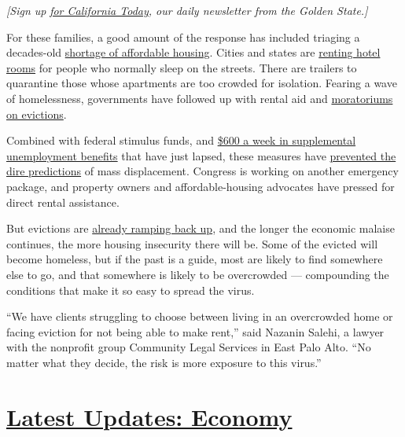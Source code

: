 \emph{{[}Sign up}
\href{https://www.nytimes3xbfgragh.onion/newsletters/california-today}{\emph{for
California Today}}\emph{, our daily newsletter from the Golden
State.{]}}

For these families, a good amount of the response has included triaging
a decades-old
\href{https://reports.nlihc.org/gap\#:~:text=The\%20U.S.\%20has\%20a\%20shortage,extremely\%20low\%2Dincome\%20renter\%20households.}{shortage
of affordable housing}. Cities and states are
\href{https://www.kqed.org/news/11825653/california-found-hotels-for-10000-homeless-residents-what-next}{renting
hotel rooms} for people who normally sleep on the streets. There are
trailers to quarantine those whose apartments are too crowded for
isolation. Fearing a wave of homelessness, governments have followed up
with rental aid and
\href{https://evictionlab.org/covid-policy-scorecard/}{moratoriums on
evictions}.

Combined with federal stimulus funds, and
\href{https://www.nytimes3xbfgragh.onion/2020/07/29/business/economy/unemployment-benefits-coronavirus.html}{\$600
a week in supplemental unemployment benefits} that have just lapsed,
these measures have
\href{https://www.nytimes3xbfgragh.onion/2020/05/31/business/economy/coronavirus-rent-landlords-tenants.html}{prevented
the dire predictions} of mass displacement. Congress is working on
another emergency package, and property owners and affordable-housing
advocates have pressed for direct rental assistance.

But evictions are
\href{https://www.nytimes3xbfgragh.onion/2020/07/23/business/evictions-moratorium-cares-act.html}{already
ramping back up}, and the longer the economic malaise continues, the
more housing insecurity there will be. Some of the evicted will become
homeless, but if the past is a guide, most are likely to find somewhere
else to go, and that somewhere is likely to be overcrowded ---
compounding the conditions that make it so easy to spread the virus.

``We have clients struggling to choose between living in an overcrowded
home or facing eviction for not being able to make rent,'' said Nazanin
Salehi, a lawyer with the nonprofit group Community Legal Services in
East Palo Alto. ``No matter what they decide, the risk is more exposure
to this virus.''

\hypertarget{latest-updates-economy}{%
\section{\texorpdfstring{\href{https://www.nytimes3xbfgragh.onion/live/2020/08/03/business/stock-market-today-coronavirus?action=click\&pgtype=Article\&state=default\&region=MAIN_CONTENT_1\&context=storylines_live_updates}{Latest
Updates:
Economy}}{Latest Updates: Economy}}\label{latest-updates-economy}}

